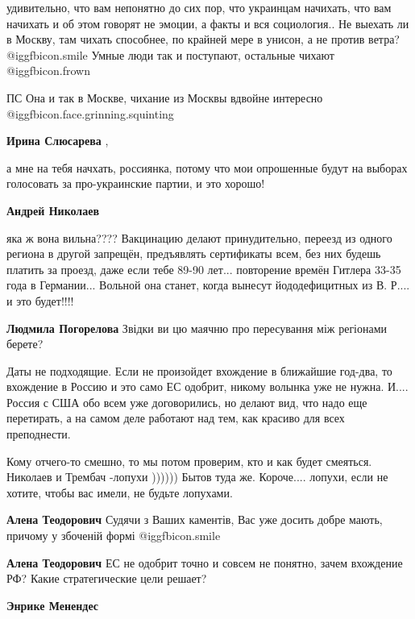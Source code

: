 \begin{itemize}
\begin{itemize}
удивительно, что вам непонятно до сих пор, что украинцам начихать, что вам
начихать и об этом говорят не эмоции, а факты и вся социология.. Не выехать ли
в Москву, там чихать способнее, по крайней мере в унисон, а не против ветра?  @igg{fbicon.smile} 
Умные люди так и поступают, остальные чихают  @igg{fbicon.frown} 

ПС Она и так в Москве, чихание из Москвы вдвойне интересно  @igg{fbicon.face.grinning.squinting} 

\textbf{Ирина Слюсарева} , 

а мне на тебя начхать, россиянка, потому что мои опрошенные будут на выборах
голосовать за про-украинские партии, и это хорошо!

\textbf{Андрей Николаев} 

яка ж вона вильна???? Вакцинацию делают принудительно, переезд из одного
региона в другой запрещён, предъявлять сертификаты всем, без них будешь платить
за проезд, даже если тебе 89-90 лет... повторение времён Гитлера 33-35 года в
Германии... Вольной она станет, когда вынесут йододефицитных из В. Р.... и это
будет!!!!


\textbf{Людмила Погорелова} Звідки ви цю маячню про пересування між регіонами берете?

\end{itemize} %


Даты не подходящие. Если не произойдет вхождение в ближайшие год-два, то
вхождение в Россию и это само ЕС одобрит, никому волынка уже не нужна.
И.... Россия с США обо всем уже договорились, но делают вид, что надо еще
перетирать, а на самом деле работают над тем, как красиво для всех преподнести.

\begin{itemize} %

Кому отчего-то смешно, то мы потом проверим, кто и как будет смеяться.
Николаев и Трембач -лопухи )))))) Бытов туда же. Короче.... лопухи, если не
хотите, чтобы вас имели, не будьте лопухами.

\textbf{Алена Теодорович} Судячи з Ваших каментів, Вас уже досить добре мають, причому у збоченій формі  @igg{fbicon.smile} 

\textbf{Алена Теодорович} ЕС не одобрит точно и совсем не понятно, зачем вхождение РФ? Какие стратегические цели решает?

\textbf{Энрике Менендес} 


\end{itemize}
\end{itemize}
